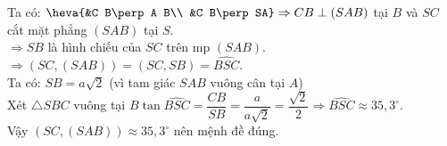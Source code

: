 \begin{ex}
{\begin{itemchoice}
{}
			\itemch Ta có: $\heva{&C B\perp A B\\ &C B\perp SA}\Rightarrow C B\perp(S A B)$ tại $B$ và $S C$ cắt mặt phẳng $(S A B)$ tại $S$.\\
			$\Rightarrow S B$ là hình chiếu của $S C$ trên mp $(S A B)$.\\
			$\Rightarrow(S C,(S A B))=(S C, S B)=\widehat{B S C}$.\\
			Ta có: $S B=a\sqrt{2}$ (vì tam giác $S A B$ vuông cân tại $A$)\\
			Xét $\triangle S B C$ vuông tại $ B\tan\widehat{BSC}=\dfrac{CB}{SB}=\dfrac{a}{a\sqrt{2}}=\dfrac{\sqrt{2}}{2}\Rightarrow\widehat{BSC}\approx 35{,}3^\circ $.\\
			Vậy $ (SC,(SAB))\approx 35{,}3^\circ $ nên mệnh đề đúng.
		\end{itemchoice}
	}
\end{ex}
%
